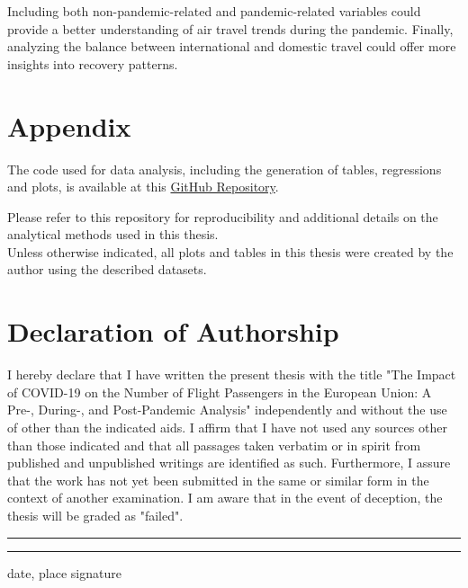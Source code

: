 \documentclass[12pt,onehalfspacing,headsepline,oneside,openright,a4paper, fleqn]{report}
\begin{document}
Including both non-pandemic-related and pandemic-related variables could provide a better understanding of air travel trends during the pandemic. Finally, analyzing the balance between international and domestic travel could offer more insights into recovery patterns.

\chapter*{Appendix}

The code used for data analysis, including the generation of tables, regressions and plots, is available at this {\hypersetup{urlcolor=TUMBlue}\href{https://github.com/valle000111/aviation-covid}{GitHub Repository}}.

\noindent Please refer to this repository for reproducibility and additional details on the analytical methods used in this thesis.
\\

\noindent Unless otherwise indicated, all plots and tables in this thesis were created by the author using the described datasets.





\newpage

\chapter*{Declaration of Authorship}
I hereby declare that I have written the present thesis with the title "The Impact of COVID-19 on the Number of Flight Passengers in the European Union: A Pre-, During-, and Post-Pandemic Analysis" independently and without the use of other than the indicated aids. I affirm that I have not used any sources other than those indicated and that all passages taken verbatim or in spirit from published and unpublished writings are identified as such. Furthermore, I assure that the work has not yet been submitted in the same or similar form in the context of another examination. I am aware that in the event of deception, the thesis will be graded as "failed".

\vspace{30mm}

\noindent\rule{5cm}{.4pt}\hfill\rule{5cm}{.4pt}\par
\hspace{8mm} date, place \hspace{75mm} signature

    
    
\newpage

\printbibliography
\end{document}

